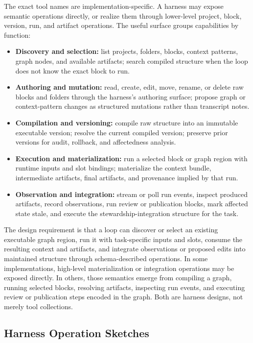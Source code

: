 \documentclass{article}
\begin{document}
The exact tool names are implementation-specific. A harness may expose semantic operations directly, or realize them through lower-level project, block, version, run, and artifact operations. The useful surface groups capabilities by function:
\begin{itemize}[leftmargin=*]
\item \textbf{Discovery and selection:} list projects, folders, blocks, context patterns, graph nodes, and available artifacts; search compiled structure when the loop does not know the exact block to run.
\item \textbf{Authoring and mutation:} read, create, edit, move, rename, or delete raw blocks and folders through the harness's authoring surface; propose graph or context-pattern changes as structured mutations rather than transcript notes.
\item \textbf{Compilation and versioning:} compile raw structure into an immutable executable version; resolve the current compiled version; preserve prior versions for audit, rollback, and affectedness analysis.
\item \textbf{Execution and materialization:} run a selected block or graph region with runtime inputs and slot bindings; materialize the context bundle, intermediate artifacts, final artifacts, and provenance implied by that run.
\item \textbf{Observation and integration:} stream or poll run events, inspect produced artifacts, record observations, run review or publication blocks, mark affected state stale, and execute the stewardship-integration structure for the task.
\end{itemize}

The design requirement is that a loop can discover or select an existing executable graph region, run it with task-specific inputs and slots, consume the resulting context and artifacts, and integrate observations or proposed edits into maintained structure through schema-described operations. In some implementations, high-level materialization or integration operations may be exposed directly. In others, those semantics emerge from compiling a graph, running selected blocks, resolving artifacts, inspecting run events, and executing review or publication steps encoded in the graph. Both are harness designs, not merely tool collections.

\subsection{Harness Operation Sketches}
\end{document}
